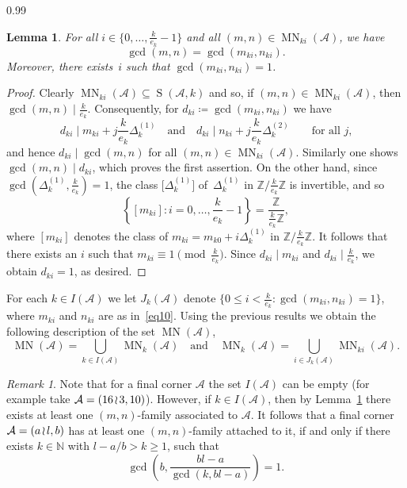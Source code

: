 \documentclass[reqno,a4paper,twoside]{amsart}
\newtheorem{lemma}[theorem]{Lemma}
\theoremstyle{definition}
\theoremstyle{remark}
\newtheorem{remark}[theorem]{Remark}
\DeclareMathOperator{\Ss}{S}
\DeclareMathOperator{\MN}{MN}
\newcommand{\wrs}{\hspace{-0.9pt}\wr\hspace{-0.9pt}}
\begin{document}
\begin{spacing}{0.99}
\begin{lemma}\label{k sobre e mayor que uno} For all $i\in \bigl\{0,\dots,\frac{k}{e_k}-1\bigr\}$ and all $(m,n)\in \MN_{ki}(\mathcal{A})$, we have
$$
\gcd(m,n)=\gcd(m_{ki},n_{ki}).
$$
Moreover, there exists~$i$ such that $\gcd(m_{ki},n_{ki})=1$.
\end{lemma}

\begin{proof}
Clearly $\MN_{ki}(\mathcal{A})\subseteq \Ss(\mathcal{A},k)$ and so, if $(m,n)\in \MN_{ki}(\mathcal{A})$, then $\gcd(m,n)\mid \frac{k}{e_k}$. Consequently, for $d_{ki}\coloneqq \gcd(m_{ki},n_{ki})$ we have
$$
d_{ki}\mid m_{ki}+j\frac{k}{e_k}\Delta_k^{\!(1)}\quad\text{and}\quad d_{ki}\mid n_{ki}+j\frac{k}{e_k}\Delta_k^{\!(2)}\qquad\text{for all $j$,}
$$
and hence $d_{ki}\mid \gcd(m,n)$ for all $(m,n)\in \MN_{ki}(\mathcal{A})$. Similarly one shows $\gcd(m,n)\mid d_{ki}$, which proves the first assertion. On the other hand, since $\gcd\left(\Delta_k^{\!(1)},\frac{k}{e_k}\right)=1$, the class $\bigl[\Delta_k^{\!(1)}\bigr]$ of~$\Delta_k^{\!(1)}$ in $\mathds{Z}/\frac{k}{e_k}\mathds{Z}$ is invertible, and so
$$
\left\{\left[m_{ki}\right]:i=0,\dots,\frac{k}{e_k}-1\right\} = \frac{\mathds{Z}}{\frac{k}{e_k}\mathds{Z}},
$$
where $[m_{ki}]$ denotes the class of $m_{ki} = m_{k0}+i\Delta_k^{\!(1)}$ in $\mathds{Z}/\frac{k}{e_k}\mathds{Z}$. It follows that there exists an $i$ such that $m_{ki}\equiv 1\pmod{\frac{k}{e_k}}$. Since $d_{ki}\mid m_{ki}$ and $d_{ki}\mid \frac{k}{e_k}$, we obtain $d_{ki}=1$, as desired.
\end{proof}

For each $k\in I(\mathcal{A})$ we let $J_k(\mathcal{A})$ denote $\bigl\{0\le i< \frac{k}{e_k}:\gcd(m_{ki},n_{ki})=1\bigr\}$, where $m_{ki}$ and $n_{ki}$ are as in~\eqref{eq10}. Using the previous results we obtain the following description of the set $\MN(\mathcal{A})$,
$$
\MN(\mathcal{A}) = \bigcup_{k\in I(\mathcal{A})} \MN_k(\mathcal{A})\quad\text{and}\quad \MN_k(\mathcal{A}) = \bigcup_{i\in J_k(\mathcal{A})} \MN_{ki}(\mathcal{A}).
$$


\begin{remark}
Note that for a final corner $\mathcal{A}$ the set $I(\mathcal{A})$ can be empty (for example take $\mathcal{A}=(16\wrs 3,10)$). However, if $k\in I(\mathcal{A})$, then by Lemma~\ref{k sobre e mayor que uno} there exists at least one $(m,n)$-family associated to $\mathcal{A}$. It follows that a final corner $\mathcal{A}=(a\wrs l,b)$ has at least one $(m,n)$-family attached to it, if and only if there exists $k\in\mathds{N}$ with $l-a/b>k\ge 1$, such that
$$
\gcd\left(b,\frac{bl-a}{\gcd(k,bl-a)}\right) = 1.
$$
\end{remark}


\end{spacing}
\end{document}
